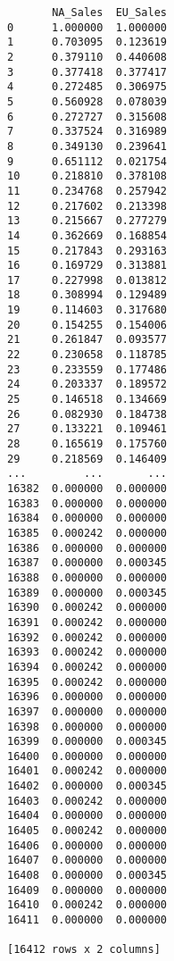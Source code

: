 \documentclass[11pt]{article}
\begin{document}
    
    \begin{verbatim}
       NA_Sales  EU_Sales
0      1.000000  1.000000
1      0.703095  0.123619
2      0.379110  0.440608
3      0.377418  0.377417
4      0.272485  0.306975
5      0.560928  0.078039
6      0.272727  0.315608
7      0.337524  0.316989
8      0.349130  0.239641
9      0.651112  0.021754
10     0.218810  0.378108
11     0.234768  0.257942
12     0.217602  0.213398
13     0.215667  0.277279
14     0.362669  0.168854
15     0.217843  0.293163
16     0.169729  0.313881
17     0.227998  0.013812
18     0.308994  0.129489
19     0.114603  0.317680
20     0.154255  0.154006
21     0.261847  0.093577
22     0.230658  0.118785
23     0.233559  0.177486
24     0.203337  0.189572
25     0.146518  0.134669
26     0.082930  0.184738
27     0.133221  0.109461
28     0.165619  0.175760
29     0.218569  0.146409
...         ...       ...
16382  0.000000  0.000000
16383  0.000000  0.000000
16384  0.000000  0.000000
16385  0.000242  0.000000
16386  0.000000  0.000000
16387  0.000000  0.000345
16388  0.000000  0.000000
16389  0.000000  0.000345
16390  0.000242  0.000000
16391  0.000242  0.000000
16392  0.000242  0.000000
16393  0.000242  0.000000
16394  0.000242  0.000000
16395  0.000242  0.000000
16396  0.000000  0.000000
16397  0.000000  0.000000
16398  0.000000  0.000000
16399  0.000000  0.000345
16400  0.000000  0.000000
16401  0.000242  0.000000
16402  0.000000  0.000345
16403  0.000242  0.000000
16404  0.000000  0.000000
16405  0.000242  0.000000
16406  0.000000  0.000000
16407  0.000000  0.000000
16408  0.000000  0.000345
16409  0.000000  0.000000
16410  0.000242  0.000000
16411  0.000000  0.000000

[16412 rows x 2 columns]
    \end{verbatim}
\end{document}
